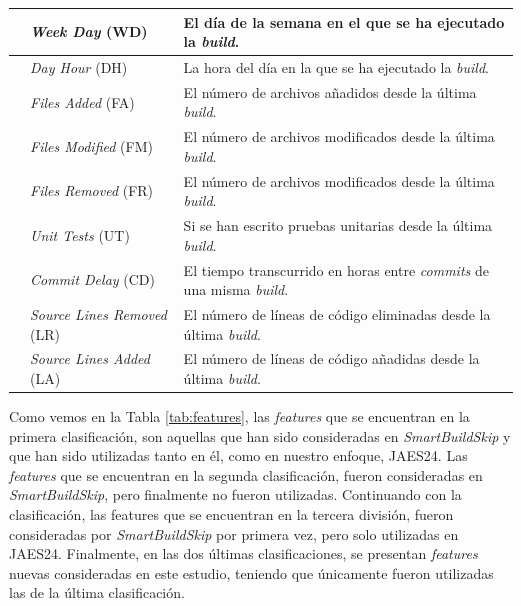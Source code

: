 \begin{table}[H]
\begin{tabular}{|>{\raggedright\arraybackslash}m{3cm}|>{\raggedright\arraybackslash}m{4cm}|>{\raggedright\arraybackslash}m{7cm}|}
        \cline{2-3}
        & \textit{Week Day} (WD) & El día de la semana en el que se ha ejecutado la \textit{build}.\\
        \cline{2-3}
        & \textit{Day Hour} (DH) & La hora del día en la que se ha ejecutado la \textit{build}.\\
        \Xhline{1pt}
        \multirow{5}{=}{Nuevas consideradas en este estudio, pero no utilizadas}& \textit{Files Added} (FA) & El número de archivos añadidos desde la última \textit{build}.\\
        \cline{2-3}
        & \textit{Files Modified} (FM) & El número de archivos modificados desde la última \textit{build}.\\
        \cline{2-3}
        & \textit{Files Removed} (FR) & El número de archivos modificados desde la última \textit{build}.\\
        \cline{2-3}
        & \textit{Unit Tests} (UT) & Si se han escrito pruebas unitarias desde la última \textit{build}.\\
        \cline{2-3}
        & \textit{Commit Delay} (CD) & El tiempo transcurrido en horas entre \textit{commits} de una misma \textit{build}.\\
        \Xhline{1pt}
        \multirow{2}{=}{Nuevas consideradas y utilizadas en este estudio} & \textit{Source Lines Removed} (LR) & El número de líneas de código eliminadas desde la última \textit{build}.\\
        \cline{2-3}
        & \textit{Source Lines Added} (LA) & El número de líneas de código añadidas desde la última \textit{build}.\\        
        \hline
    \end{tabular}
\end{table}

Como vemos en la Tabla \ref{tab:features}, las \textit{features} que se encuentran en la primera
clasificación, son aquellas que han sido consideradas en \textit{SmartBuildSkip} \cite{2} y que
han sido utilizadas tanto en él, como en nuestro enfoque, JAES24. Las \textit{features} que se
encuentran en la segunda clasificación, fueron consideradas en \textit{SmartBuildSkip}, pero
finalmente no fueron utilizadas. Continuando con la clasificación, las features que se encuentran
en la tercera división, fueron consideradas por \textit{SmartBuildSkip} por primera vez, pero solo
utilizadas en JAES24. Finalmente, en las dos últimas clasificaciones, se presentan
\textit{features} nuevas consideradas en este estudio, teniendo que únicamente fueron utilizadas
las de la última clasificación.\\

